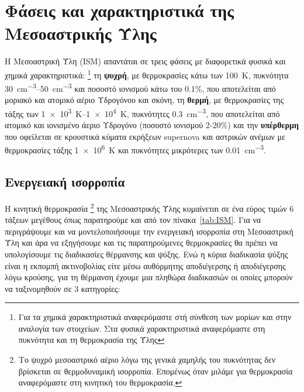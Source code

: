 \documentclass[article,a4paper,11.2pt]{memoir}
\numberwithin{equation}{subsection}
\begin{document}
\section{Φάσεις και χαρακτηριστικά της Μεσοαστρικής Ύλης}
Η Μεσοαστρική Ύλη (ISM) απαντάται σε τρεις φάσεις με διαφορετικά φυσικά και χημικά χαρακτηριστικά: 
\footnote{Για τα χημικά χαρακτηριστικά αναφερόμαστε στή σύνθεση των μορίων και στην αναλογία των στοιχείων. Στα φυσικά χαρακτηριστικά αναφερόμαστε στη πυκνότητα και τη θερμοκρασία της Ύλης} 
τη \textbf{ψυχρή}, με θερμοκρασίες κάτω των \SI{100}{\kelvin},
 πυκνότητα \SIrange{30}{50}{cm^{-3}} και ποσοστό ιονισμού κάτω του 0.1\%, που αποτελείται από μοριακό και ατομικό αέριο Υδρογόνου και σκόνη, τη \textbf{θερμή}, με θερμοκρασίες της τάξης των \SIrange{1e3}{1e4}{K}, πυκνότητες \SI{0.3}{cm^{-3}}, που αποτελείται από ατομικό και ιονισμένο άεριο Υδρογόνο (ποσοστό ιονισμού 2-20\%) και την \textbf{υπέρθερμη} που οφείλεται σε κρουστικά κύματα εκρήξεων supernova και αστρικών ανέμων με θερμοκρασίες τάξης \SI{1e6}{K} και πυκνότητες μικρότερες των \SI{0.01}{cm^{-3}}.


\subsection{Ενεργειακή ισορροπία}
\label{par:EnergyBalance}
Η κινητική θερμοκρασία \footnote{Το ψυχρό μεσοαστρικό αέριο λόγω της γενικά χαμηλής του πυκνότητας δεν βρίσκεται σε θερμοδυναμική ισορροπία. Επομένως όταν μιλάμε για θερμοκρασία αναφερόμαστε στη κινητική του θερμοκρασία.\cite[p. 28]{spitzer_1998}} της Μεσοαστρικής Ύλης κυμαίνεται σε ένα εύρος τιμών 6 τάξεων μεγέθους όπως παρατηρούμε και από τον πίνακα~\ref{tab:ISM}. Για να περιγράψουμε και να μοντελοποιήσουμε την ενεργειακή ισορροπία στη Μεσοαστρική Ύλη και άρα να εξηγήσουμε και τις παρατηρούμενες θερμοκρασίες θα πρέπει να υπολογίσουμε τις διαδικασίες θέρμανσης και ψύξης. 
Ενώ η κύρια διαδικασία ψύξης είναι η εκπομπή ακτινοβολίας είτε μέσω αυθόρμητης αποδιέγερσης ή αποδιέγερσης λόγω κρούσης, για τη θέρμανση έχουμε μια πληθώρα διαδικασιών οι οποίες μπορούν να ταξινομηθούν σε 3 κατηγορίες:
\end{document}
